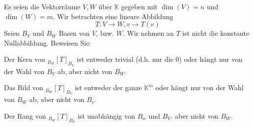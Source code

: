 \begin{Problem}
	Es seien die Vektorräume $V, W$ über $\mathbb{K}$ gegeben mit $\dim(V) = n$ und $\dim(W ) = m$. Wir betrachten eine lineare Abbildung
	\[
	T:V\to W, v\to T(v)\] 
Seien $B_V$ und $B_W$ Basen von $V$, bzw. $W$. Wir nehmen an $T$ ist nicht die konstante Nullabbildung. Beweisen Sie:
\begin{parts}
\item Der Kern von $_{B_W}[T]_{B_V}$ ist entweder trivial (d.h. nur die 0) oder hängt nur von der Wahl von $B_V$ ab, aber nicht von $B_W$.
\item Das Bild von $_{B_W}[T]_{B_V}$ ist entweder der ganze $\mathbb{K}^m$ oder hängt nur von der Wahl von $B_W$ ab, aber nicht von $B_v$. 
\item Der Rang von $_{B_W}[T]_{B_V}$ ist unabh\"{a}ngig von $B_w$ und $B_V$.
aber nicht von $B_W$.
\end{parts}
\end{Problem}
